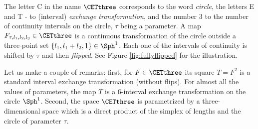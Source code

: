\documentclass[12pt]{article}
\theoremstyle{definition}
\begin{document}
The letter C in the name  $\CETthree$ corresponds to the word \emph{circle}, the letters E and T - to (interval) \emph{exchange transformation}, and the number $3$ to the number of continuity intervals on the circle, $\tau$ being a parameter. A map $F_{\tau, l_1, l_2, l_3} \in \CETthree$ is a continuous transformation of the circle outside a three-point set $\{l_1, l_1+l_2,1\} \in \Sph^1$. Each one of the intervals of continuity is shifted by $\tau$ and then \emph{flipped}. See Figure \ref{fig:fullyflipped} for the illustration. 

Let us make a couple of remarks: first, for $F \in \CETthree$ its square $T=F^2$ is a standard interval exchange transformation (without flips). For almost all the values of parameters, the map $T$ is a $6$-interval exchange transformation on the circle $\Sph^1$. Second, the space $\CETthree$ is parametrized by a three-dimensional space which is a direct product of the simplex of lengths and the circle of parameter $\tau$.
\end{document}
